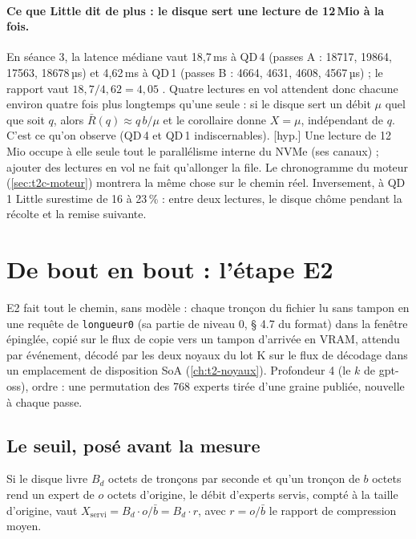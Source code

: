 \paragraph{Ce que Little dit de plus : le disque sert une lecture de 12\,Mio à la fois.} En séance 3, la latence médiane vaut 18,7\,ms à QD\,4 (passes A : \num{18717}, \num{19864}, \num{17563}, \num{18678}\,µs) et 4,62\,ms à QD\,1 (passes B : \num{4664}, \num{4631}, \num{4608}, \num{4567}\,µs) \mes ; le rapport vaut $18{,}7 / 4{,}62 = 4{,}05$ \calc. Quatre lectures en vol attendent donc chacune environ quatre fois plus longtemps qu'une seule : si le disque sert un débit $\mu$ quel que soit $q$, alors $\bar R(q) \approx q\,b/\mu$ et le corollaire donne $X = \mu$, indépendant de $q$. C'est ce qu'on observe (QD\,4 et QD\,1 indiscernables). [hyp.] Une lecture de 12\,Mio occupe à elle seule tout le parallélisme interne du NVMe (ses canaux) ; ajouter des lectures en vol ne fait qu'allonger la file. Le chronogramme du moteur (\cref{sec:t2c-moteur}) montrera la même chose sur le chemin réel. Inversement, à QD\,1 Little surestime de 16 à 23\,\% : entre deux lectures, le disque chôme pendant la récolte et la remise suivante.

\section{De bout en bout : l'étape E2}\label{sec:t2c-e2}

E2 fait tout le chemin, sans modèle : chaque tronçon du fichier lu sans tampon en une requête de \texttt{longueur0} (sa partie de niveau 0, § 4.7 du format) dans la fenêtre épinglée, copié sur le flux de copie vers un tampon d'arrivée en VRAM, attendu par événement, décodé par les deux noyaux du lot K sur le flux de décodage dans un emplacement de disposition SoA (\cref{ch:t2-noyaux}). Profondeur 4 (le $k$ de gpt-oss), ordre : une permutation des 768 experts tirée d'une graine publiée, nouvelle à chaque passe.

\subsection{Le seuil, posé avant la mesure}

\begin{proposition}\label{prop:t2c-seuil-e2}
Si le disque livre $B_d$ octets de tronçons par seconde et qu'un tronçon de $b$ octets rend un expert de $o$ octets d'origine, le débit d'experts servis, compté à la taille d'origine, vaut $X_{\mathrm{servi}} = B_d \cdot o / \bar b = B_d \cdot r$, avec $r = o / \bar b$ le rapport de compression moyen.
\end{proposition}

